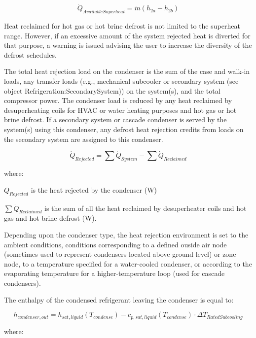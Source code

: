 \begin{equation}
{\dot Q_{AvailableSuperheat}} = \dot m \left( {{h_{2a}} - {h_{2b}}} \right)
\end{equation}

Heat reclaimed for hot gas or hot brine defrost is not limited to the superheat range. However, if an excessive amount of the system rejected heat is diverted for that purpose, a warning is issued advising the user to increase the diversity of the defrost schedules.

The total heat rejection load on the condenser is the sum of the case and walk-in loads, any transfer loads (e.g., mechanical subcooler or secondary system (see object Refrigeration:SecondarySystem)) on the system(s), and the total compressor power. The condenser load is reduced by any heat reclaimed by desuperheating coils for HVAC or water heating purposes and hot gas or hot brine defrost. If a secondary system or cascade condenser is served by the system(s) using this condenser, any defrost heat rejection credits from loads on the secondary system are assigned to this condenser.

\begin{equation}
{\dot Q_{Rejected}} = \sum {{{\dot Q}_{System}}}  - \sum {{{\dot Q}_{Reclaimed}}}
\end{equation}

where:

\(\dot{Q}_{Rejected}\) is the heat rejected by the condenser (W)

\(\sum {{{\dot Q}_{Reclaimed}}}\) is the sum of all the heat reclaimed by desuperheater coils and hot gas and hot brine defrost (W).

Depending upon the condenser type, the heat rejection environment is set to the ambient conditions, conditions corresponding to a defined ouside air node (sometimes used to represent condensers located above ground level) or zone node, to a temperature specified for a water-cooled condenser, or according to the evaporating temperature for a higher-temperature loop (used for cascade condensers).

The enthalpy of the condensed refrigerant leaving the condenser is equal to:

\begin{equation}
{h_{condenser,out}} = {h_{sat,liquid}}({T_{condense}}) - {c_{p,sat,liquid}}({T_{condense}}) \cdot \Delta {T_{RatedSubcooling}}
\end{equation}

where:

